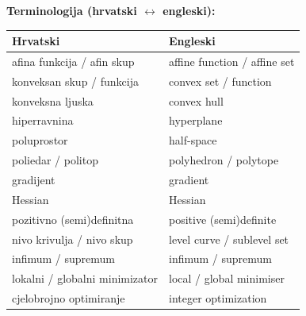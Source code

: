 \textbf{Terminologija (hrvatski $\leftrightarrow$ engleski):}

\begin{center}
\begin{tabular}{ll}
\toprule
\textbf{Hrvatski} & \textbf{Engleski} \\
\midrule
afina funkcija / afin skup & affine function / affine set \\
konveksan skup / funkcija & convex set / function \\
konveksna ljuska & convex hull \\
hiperravnina & hyperplane \\
poluprostor & half-space \\
poliedar / politop & polyhedron / polytope \\
gradijent & gradient \\
Hessian & Hessian \\
pozitivno (semi)definitna & positive (semi)definite \\
nivo krivulja / nivo skup & level curve / sublevel set \\
infimum / supremum & infimum / supremum \\
lokalni / globalni minimizator & local / global minimiser \\
cjelobrojno optimiranje & integer optimization \\
\bottomrule
\end{tabular}
\end{center}
